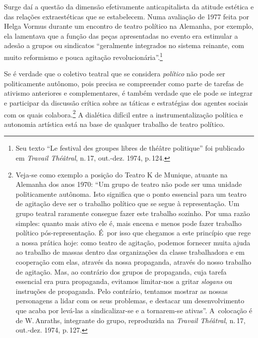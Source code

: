 {

Surge daí a questão da dimensão efetivamente anticapitalista da
atitude estética e das relações extraestéticas que se estabelecem. Numa
avaliação de 1977 feita por Helga Vormus durante um encontro de teatro
político na Alemanha, por exemplo, ela lamentava que a função das peças
apresentadas no evento era estimular a adesão a grupos ou sindicatos
“geralmente integrados no sistema reinante, com muito reformismo e pouca
agitação revolucionária”.\footnote{Seu texto “Le festival des groupes
  libres de théâtre politique” foi publicado em
  {\it Travail Théâtral}, n.\,17, out.-dez. 1974, p.\,124.}

Se é verdade que o coletivo teatral que se considera {\it político} não
pode ser politicamente autônomo, pois precisa se compreender como parte
de tarefas de ativismo anteriores e complementares, é também verdade que
ele pode se integrar e participar da discussão crítica sobre as táticas
e estratégias dos agentes sociais com os quais colabora.\footnote{Veja-se
  como exemplo a posição do Teatro K de Munique, atuante na
  Alemanha dos anos 1970: “Um grupo de teatro não pode ser uma unidade
  politicamente autônoma. Isto significa que o ponto essencial para um
  teatro de agitação deve ser o trabalho político que se segue à
  representação. Um grupo teatral raramente consegue fazer este trabalho
  sozinho. Por uma razão simples: quanto mais ativo ele é, mais encena e
  menos pode fazer trabalho político pós-representação. É~por isso que
  chegamos a este princípio que rege a nossa prática hoje: como teatro
  de agitação, podemos fornecer muita ajuda ao trabalho de massas dentro
  das organizações da classe trabalhadora e em cooperação com elas,
  através da nossa propaganda, através do nosso trabalho de agitação.
  Mas, ao contrário dos grupos de propaganda, cuja tarefa essencial era
  pura propaganda, evitamos limitar-nos a gritar {\it slogans} ou instruções
  de propaganda. Pelo contrário, tentamos mostrar as nossas personagens
  a lidar com os seus problemas, e destacar um desenvolvimento que acaba
  por levá-las a sindicalizar-se e a tornarem-se ativas”. A~colocação é
  de W.\,Anraths, integrante do grupo, reproduzida na {\it Travail
  Théâtral}, n.\,17, out.-dez. 1974, p.\,127.} A dialética difícil entre a
instrumentalização política e autonomia artística está na base de
qualquer trabalho de teatro político.

}
